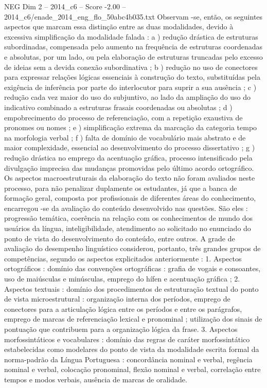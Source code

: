 \begin{textsample}{NEG Dim 2 – 2014\_c6 – Score -2.00 – 2014\_c6/enade\_2014\_eng\_flo\_50abc4b035.txt}
Observam -se, então, os seguintes aspectos que marcam essa distinção entre as duas modalidades, devido à excessiva simplificação da modalidade falada : a ) redução drástica de estruturas subordinadas, compensada pelo aumento na frequência de estruturas coordenadas e absolutas, por um lado, ou pela elaboração de estruturas truncadas pelo excesso de ideias sem a devida conexão subordinativa ; b ) redução no uso de conectores para expressar relações lógicas essenciais à construção do texto, substituídas pela exigência de inferência por parte do interlocutor para suprir a sua ausência ; c ) redução cada vez maior do uso do subjuntivo, ao lado da ampliação do uso do indicativo combinado a estruturas frasais coordenadas ou absolutas ; d ) empobrecimento do processo de referenciação, com a repetição exaustiva de pronomes ou nomes ; e ) simplificação extrema da marcação da categoria tempo na morfologia verbal ; f ) falta de domínio de vocabulário mais abstrato e de maior complexidade, essencial ao desenvolvimento do processo dissertativo ; g ) redução drástica no emprego da acentuação gráfica, processo intensificado pela divulgação imprecisa das mudanças promovidas pelo último acordo ortográfico.
Os aspectos macroestruturais da elaboração do texto não foram avaliados neste processo, para não penalizar duplamente os estudantes, já que a banca de formação geral, composta por profissionais de diferentes áreas do conhecimento, encarregou -se da avaliação do conteúdo desenvolvido nas questões.
São eles : progressão temática, coerência na relação com os conhecimentos de mundo dos usuários da língua, inteligibilidade, atendimento ao solicitado no enunciado do ponto de vista do desenvolvimento do conteúdo, entre outros.
A grade de avaliação do desempenho linguístico considerou, portanto, três grandes grupos de competências, segundo os aspectos explicitados anteriormente : 1.
Aspectos ortográficos : domínio das convenções ortográficas : grafia de vogais e consoantes, uso de maiúsculas e minúsculas, emprego do hífen e acentuação gráfica ; 2.
Aspectos textuais : domínio dos procedimentos de estruturação textual do ponto de vista microestrutural : organização interna dos períodos, emprego de conectores para a articulação lógica entre os períodos e entre os parágrafos, emprego de marcas de referenciação lexical e pronominal ; utilização dos sinais de pontuação que contribuem para a organização lógica da frase. 3.
Aspectos morfossintáticos e vocabulares : domínio das regras de caráter morfossintático estabelecidas como modelares do ponto de vista da modalidade escrita formal da norma-padrão da Língua Portuguesa : concordância nominal e verbal, regência nominal e verbal, colocação pronominal, flexão nominal e verbal, correlação entre tempos e modos verbais, ausência de marcas de oralidade.

\end{textsample}
